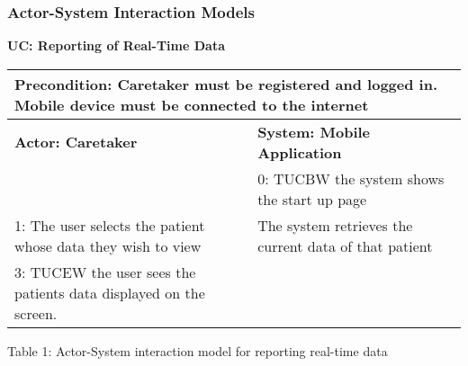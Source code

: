 \subsubsection{Actor-System Interaction Models}
\noindent\textbf{UC: Reporting of Real-Time Data}
				\begin{flushleft}
					\begin{tabular}{ |p{7cm}|p{7cm}| }
   						\hline
  						\multicolumn{2}{|p{\textwidth}|}{\textbf{Precondition:} Caretaker must be registered and logged in. Mobile device must be connected to the internet} \\
 						\hline
						\textbf {Actor: Caretaker} & \textbf{System: Mobile Application}\\
						\hline
						 & 0: TUCBW the system shows the start up page\\
						\hline
 						1: The user selects the patient whose data they wish to view & The system retrieves the current data of that patient\\
						\hline
						3: TUCEW the user sees the patients data displayed on the screen. & \\
  						\hline

				\end{tabular}

			\end{flushleft}
			\begin{center}
    			Table 1: Actor-System interaction model for reporting real-time data
			\end{center}
			
			
